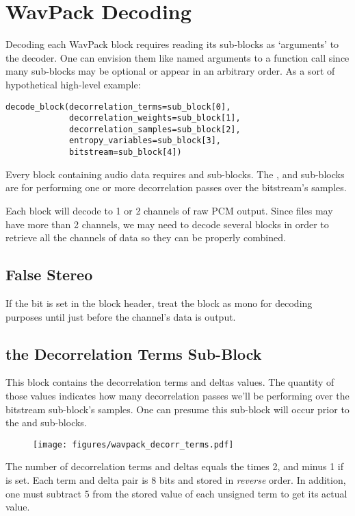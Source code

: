 \section{WavPack Decoding}
Decoding each WavPack block requires reading its sub-blocks
as `arguments' to the decoder.
One can envision them like named arguments to a function call
since many sub-blocks may be optional or appear in an arbitrary order.
As a sort of hypothetical high-level example:
\begin{Verbatim}[frame=single]
decode_block(decorrelation_terms=sub_block[0],
             decorrelation_weights=sub_block[1],
             decorrelation_samples=sub_block[2],
             entropy_variables=sub_block[3],
             bitstream=sub_block[4])
\end{Verbatim}
Every block containing audio data requires
 and  sub-blocks.
The , 
and  sub-blocks are for performing
one or more decorrelation passes over the bitstream's samples.

Each block will decode to 1 or 2 channels of raw PCM output.
Since files may have more than 2 channels, we may need to
decode several blocks in order to retrieve all the channels
of data so they can be properly combined.

\clearpage

\subsection{False Stereo}

If the  bit is set in the block header,
treat the block as mono for decoding purposes until
just before the channel's data is output.

\subsection{the Decorrelation Terms Sub-Block}
This block contains the decorrelation terms and deltas values.
The quantity of those values indicates how many decorrelation passes
we'll be performing over the bitstream sub-block's samples.
One can presume this sub-block will occur prior to the
 and  sub-blocks.

\label{wavpack_decorr_terms}
\begin{figure}[h]
\texttt{[image: figures/wavpack\_decorr\_terms.pdf]}
\end{figure}
\par
\noindent
The number of decorrelation terms and deltas
equals the  times 2, and minus 1 if
 is set.
Each term and delta pair is 8 bits and stored in \textit{reverse} order.
In addition, one must subtract 5 from the stored value of each
unsigned term to get its actual value.

